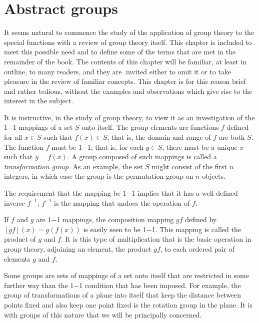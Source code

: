 \chapter{Abstract groups}

It seems natural to commence the study of the application of group theory to the special functions with a review of group theory itself. This chapter is included to meet this possible need and to define some of the terms that are met in the remainder of the book. The contents of this chapter will be familiar, at least in outline, to many readers, and they are .invited either to omit it or to take pleasure in the review of familiar concepts. This chapter is for this reason brief and rather tedious, without the examples and observations which give rise to the interest in the subject. 

It is instructive, in the study of group theory, to view it as an investigation of the 1$-$1 mappings of a set $S$ onto itself. The group elements are functions $f$ defined for all $x \in S$ such that $f(x) \in S$, that is, the domain and range of $f$ are both $S$. The function $f$ must be 1$-$1; that is, for each $y \in S$, there must be a unique $x$ such that $y = f(x)$. A group composed of such mappings is called a \emph{transformation group}. As an example, the set $S$ might consist of the first $n$ integers, in which case the group is the permutation group on $n$ objects.

The requirement that the mapping be 1$-$1 implies that it has a well-defined inverse $f^{-1}$; $f^{-1}$ is the mapping that undoes the operation of $f$.

If $f$ and $g$ are 1$-$1 mappings, the composition mapping $gf$ defined by $[gf] (x) = g(f(x))$ is easily seen to be 1$-$1. This mapping is called the product of $g$ and $f$. It is this type of multiplication that is the basic operation in group theory, adjoining an element, the product $gf$, to each ordered pair of elements $g$ and $f$.

Some groups are sets of mappings of a set onto itself that are restricted in some further way than the 1$-$1 condition that has been imposed. For example, the group of transformations of a plane into itself that keep the distance between points fixed and also keep one point fixed is the rotation group in the plane. It is with groups of this nature that we will be principally concerned.


%

%

%



\endinput